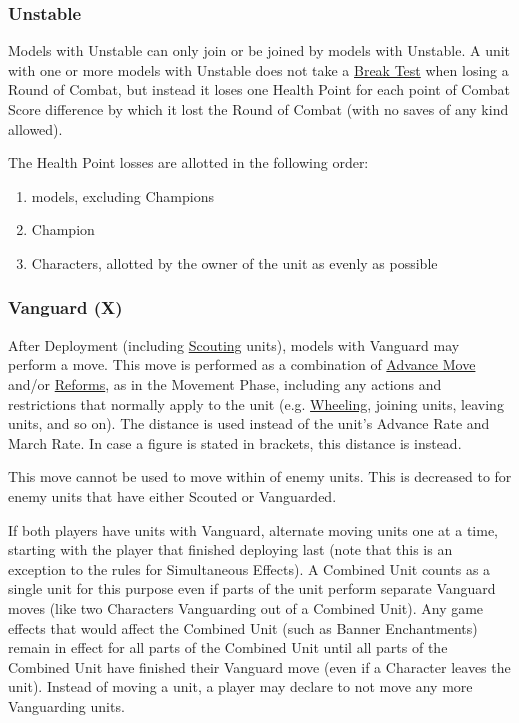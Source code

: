 \subsubsection{Unstable}
\idx[main=y]{\unstable}\label{unstable}

Models with Unstable can only join or be joined by models with Unstable. A unit with one or more models with Unstable does not take a \hyperref[break_test]{Break Test} when losing a Round of Combat, but instead it loses one Health Point for each point of Combat Score difference by which it lost the Round of Combat (with no saves of any kind allowed).

The Health Point losses are allotted in the following order:
\begin{enumerate}
\item \rnf{} models, excluding Champions
\item Champion
\item Characters, allotted by the owner of the unit as evenly as possible
\end{enumerate}

\subsubsection{Vanguard (X)}
\idx[main=y]{\vanguard}\label{vanguard}

After Deployment (including \hyperref[scout]{Scouting} units), models with Vanguard may perform a  move. This move is performed as a combination of \hyperref[advance_move]{Advance Move} and/or \hyperref[reform]{Reforms}, as in the Movement Phase, including any actions and restrictions that normally apply to the unit (e.g. \hyperref[pivots_and_wheels]{Wheeling}, joining units, leaving units, and so on). The  distance is used instead of the unit's Advance Rate and March Rate. In case a figure is stated in brackets, this distance is  instead.

This move cannot be used to move within  of enemy units. This is decreased to  for enemy units that have either Scouted or Vanguarded.

If both players have units with Vanguard, alternate moving units one at a time, starting with the player that finished deploying last (note that this is an exception to the rules for Simultaneous Effects). A Combined Unit counts as a single unit for this purpose even if parts of the unit perform separate Vanguard moves (like two Characters Vanguarding out of a Combined Unit). Any game effects that would affect the Combined Unit (such as Banner Enchantments) remain in effect for all parts of the Combined Unit until all parts of the Combined Unit have finished their Vanguard move (even if a Character leaves the unit). Instead of moving a unit, a player may declare to not move any more Vanguarding units.

